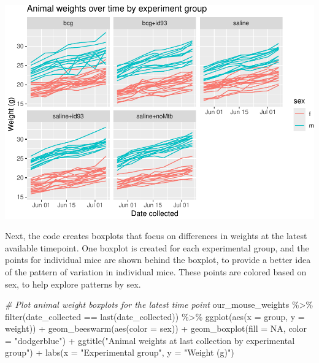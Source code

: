 \documentclass[
]{book}
\newenvironment{Shaded}{\begin{snugshade}}{\end{snugshade}}
\newcommand{\AttributeTok}[1]{\textcolor[rgb]{0.77,0.63,0.00}{#1}}
\newcommand{\CommentTok}[1]{\textcolor[rgb]{0.56,0.35,0.01}{\textit{#1}}}
\newcommand{\ConstantTok}[1]{\textcolor[rgb]{0.00,0.00,0.00}{#1}}
\newcommand{\FunctionTok}[1]{\textcolor[rgb]{0.00,0.00,0.00}{#1}}
\newcommand{\NormalTok}[1]{#1}
\newcommand{\SpecialCharTok}[1]{\textcolor[rgb]{0.00,0.00,0.00}{#1}}
\newcommand{\StringTok}[1]{\textcolor[rgb]{0.31,0.60,0.02}{#1}}
\begin{document}
\includegraphics{csu-impactb_files/figure-latex/unnamed-chunk-15-1.pdf}

Next, the code creates boxplots that focus on differences in weights at the
latest available timepoint. One boxplot is created for each experimental
group, and the points for individual mice are shown behind the boxplot, to
provide a better idea of the pattern of variation in individual mice. These
points are colored based on sex, to help explore patterns by sex.

\begin{Shaded}
\begin{Highlighting}[]
\CommentTok{\# Plot animal weight boxplots for the latest time point }
\NormalTok{our\_mouse\_weights }\SpecialCharTok{\%\textgreater{}\%} 
  \FunctionTok{filter}\NormalTok{(date\_collected }\SpecialCharTok{==} \FunctionTok{last}\NormalTok{(date\_collected)) }\SpecialCharTok{\%\textgreater{}\%} 
  \FunctionTok{ggplot}\NormalTok{(}\FunctionTok{aes}\NormalTok{(}\AttributeTok{x =}\NormalTok{ group, }\AttributeTok{y =}\NormalTok{ weight)) }\SpecialCharTok{+} 
  \FunctionTok{geom\_beeswarm}\NormalTok{(}\FunctionTok{aes}\NormalTok{(}\AttributeTok{color =}\NormalTok{ sex)) }\SpecialCharTok{+} 
  \FunctionTok{geom\_boxplot}\NormalTok{(}\AttributeTok{fill =} \ConstantTok{NA}\NormalTok{, }\AttributeTok{color =} \StringTok{"dodgerblue"}\NormalTok{) }\SpecialCharTok{+} 
  \FunctionTok{ggtitle}\NormalTok{(}\StringTok{"Animal weights at last collection by experimental group"}\NormalTok{) }\SpecialCharTok{+} 
  \FunctionTok{labs}\NormalTok{(}\AttributeTok{x =} \StringTok{"Experimental group"}\NormalTok{, }
       \AttributeTok{y =} \StringTok{"Weight (g)"}\NormalTok{)}
\end{Highlighting}
\end{Shaded}
\end{document}
